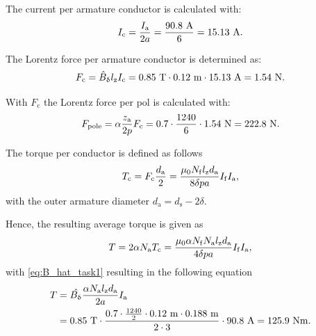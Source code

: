 \begin{solutionblock}
    The current per armature conductor is calculated with:
    \begin{equation}
        I_{\mathrm{c}} = \frac{\Ia}{2a}
        = \frac{90.8 \ \si{A}}{6}
        = 15.13 \ \si{A}.
    \end{equation}

    The Lorentz force per armature conductor is determined as:
    \begin{equation}
        F_{\mathrm{c}} = \hat{B}_{\updelta} \lz I_{\mathrm{c}}
        = 0.85 \ \si{T} \cdot 0.12 \ \si{m} \cdot 15.13 \ \si{A}
        = 1.54 \ \si{N}.
    \end{equation}

    With $F_{\mathrm{c}}$ the Lorentz force per pol is calculated with:
    \begin{equation}
        F_{\mathrm{pole}} = \alpha \frac{\za}{2p} F_{\mathrm{c}}
        = 0.7 \cdot \frac{1240}{6} \cdot 1.54 \ \si{N}
        = 222.8 \ \si{N}.
    \end{equation}


    The torque per conductor is defined as follows 
    \begin{equation}
        T_{\mathrm{c}} = F_{\mathrm{c}} \frac{d_{\mathrm{a}}}{2}
        = \frac{\mu_{\mathrm{0}} N_{\mathrm{f}} \lz d_{\mathrm{a}}}{8\delta p a} I_{\mathrm{f}}I_{\mathrm{a}},
    \end{equation}
    with the outer armature diameter $d_{\mathrm{a}} = d_{\mathrm{s}} - 2\delta$.

    Hence, the resulting average torque is given as
    \begin{equation}
        T = 2 \alpha N_{\mathrm{a}} T_{\mathrm{c}}
        = \frac{\mu_{\mathrm{0}} \alpha N_{\mathrm{f}} N_{\mathrm{a}} \lz d_{\mathrm{a}}}{4 \delta p a} I_{\mathrm{f}} I_{\mathrm{a}},
    \end{equation}
    with \eqref{eq:B_hat_task1} resulting in the following equation
    \begin{align}
        \begin{split}
            T &= \hat{B_{\updelta}} \frac{\alpha N_{\mathrm{a}} \lz d_{\mathrm{a}}}{2a} \Ia\\
            &= 0.85 \ \si{T} \cdot \frac{0.7 \cdot \frac{1240}{2} \cdot 0.12 \ \si{m} \cdot 0.188 \ \si{m}}{2 \cdot 3} \cdot 90.8 \ \si{A}
            = 125.9 \ \si{Nm}.
        \end{split}
    \end{align}

   

\end{solutionblock}



